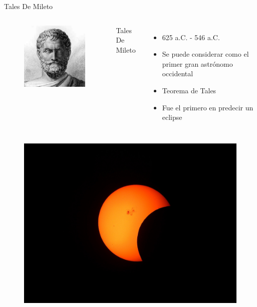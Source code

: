 \documentclass{beamer}
\begin{document}

\begin{frame}{Tales De Mileto}
\begin{columns}
\begin{figure}
 \centering
 \includegraphics[scale=0.5]{Imagenes/Tales_De_Mileto}
 \end{figure}
 \begin{center}
 \small
 Tales De Mileto
 \end{center}
\begin{itemize}
\item 625 a.C. - 546 a.C.
\item Se puede considerar como el primer gran astrónomo occidental
\item Teorema de Tales
\item Fue el primero en predecir un eclipse
\end{itemize}
\end{columns}
\end{frame}


\begin{frame}
\begin{figure}
 \centering
 \includegraphics[scale=0.14]{Imagenes/Eclipse_solar}
 \end{figure}
\end{frame}
\end{document}
